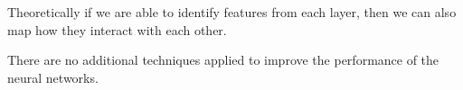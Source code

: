 
Theoretically if we are able to identify features from each layer, then we can also map how they interact with each other. 










There are no additional techniques applied to improve the performance of the neural networks.